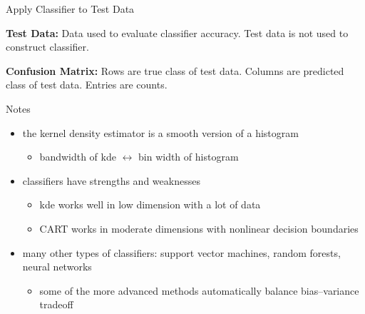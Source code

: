 \documentclass[12pt]{beamer}
\begin{document}
\begin{frame}{Apply Classifier to Test Data}

\textbf{Test Data:} Data used to evaluate classifier accuracy. Test data is not used to construct classifier.

\vspace{.1in}

\textbf{Confusion Matrix:} Rows are true class of test data. Columns are predicted class of test data. Entries are counts.

\vspace{.2in}

\begin{center}

\end{center}

\end{frame}


\begin{frame}{Notes}
  \begin{itemize}
  \item the kernel density estimator is a smooth version of a histogram
    \begin{itemize}
    \item bandwidth of kde $\leftrightarrow$ bin width of histogram
    \end{itemize}
  \item classifiers have strengths and weaknesses
    \begin{itemize}
    \item kde works well in low dimension with a lot of data
    \item CART works in moderate dimensions with nonlinear decision boundaries
    \end{itemize}
  \item many other types of classifiers: support vector machines, random forests, neural networks
    \begin{itemize}
    \item some of the more advanced methods automatically balance bias--variance tradeoff
    \end{itemize}
  \end{itemize}
\end{frame}


\end{document}
